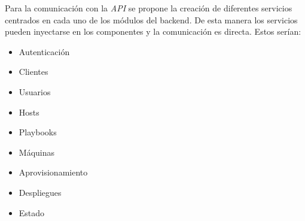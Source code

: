 Para la comunicación con la \textit{API} se propone la creación de diferentes servicios centrados en cada uno de los módulos del backend. De esta manera los servicios pueden inyectarse en los componentes y la comunicación es directa. Estos serían:
\begin{itemize}
	\item Autenticación
	\item Clientes
	\item Usuarios
	\item Hosts
	\item Playbooks
	\item Máquinas
	\item Aprovisionamiento
	\item Despliegues
	\item Estado
\end{itemize}

